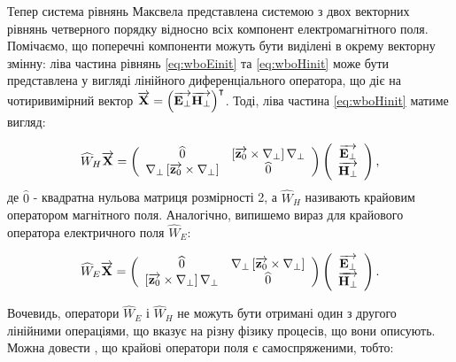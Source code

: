 Тепер система рівнянь Максвела представлена системою з двох векторних рівнянь 
четверного порядку відносно всіх компонент електромагнітного поля.
Помічаємо, що поперечні компоненти можуть бути виділені в окрему векторну 
змінну: ліва частина рівнянь \eqref{eq:wboEinit} та \eqref{eq:wboHinit} може 
бути представлена у вигляді лінійного диференціального оператора, що діє на
чотиривимірний вектор 
$ \overrightarrow{\mathbf X} = \left( \overrightarrow{\mathbf E_\perp} \overrightarrow{\mathbf H_\perp} \right)^\intercal $. Тоді,
ліва частина \eqref{eq:wboHinit} матиме вигляд:

\begin{equation} \label{eq:W_H}
\widehat{W}_H \overrightarrow{\mathbf X} = \left( \begin{array}{cc} \widehat{0} & 
\left[ \overrightarrow{\mathbf z_0} \times \nabla_\perp \right] \nabla_\perp \\
\nabla_\perp \left[ \overrightarrow{\mathbf z_0} \times \nabla_\perp \right] &
\widehat{0} \\ \end{array} \right) \left( \begin{array}{c} 
\overrightarrow{\mathbf E_\perp} \\ \overrightarrow{\mathbf H_\perp} \\ \end{array} \right),
\end{equation}
%
де $ \widehat{0} $ - квадратна нульова матриця розмірності 2, а 
$ \widehat{W}_H $ називають крайовим оператором магнітного поля. Аналогічно,
випишемо вираз для крайового оператора електричного поля $ \widehat{W}_E $:

\begin{equation} \label{eq:W_E}
\widehat{W}_E \overrightarrow{\mathbf X} = \left( \begin{array}{cc} \widehat{0} & 
\nabla_\perp \left[ \overrightarrow{\mathbf z_0} \times \nabla_\perp \right] \\
\left[ \overrightarrow{\mathbf z_0} \times \nabla_\perp \right] \nabla_\perp &
\widehat{0} \\ \end{array} \right) \left( \begin{array}{c} 
\overrightarrow{\mathbf E_\perp} \\ \overrightarrow{\mathbf H_\perp} \\ \end{array} \right).
\end{equation}

Вочевидь, оператори $ \widehat{W}_E $ і $ \widehat{W}_H $ не можуть бути 
отримані один з другого лінійними операціями, що вказує на різну фізику 
процесів, що вони описують. Можна довести 
\cite{imp:Dumin1996, imp:Tretyakov1993}, що крайові оператори поля є 
самоспряженими, тобто:

